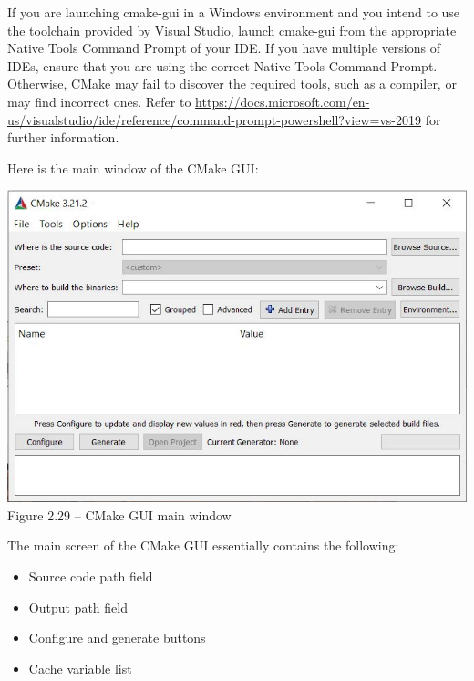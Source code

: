 \begin{tcolorbox}[colback=webgreen!5!white,colframe=webgreen!75!black,title=Note]
If you are launching cmake-gui in a Windows environment and you intend to use the toolchain provided by Visual Studio, launch cmake-gui from the appropriate Native Tools Command Prompt of your IDE. If you have multiple versions of IDEs, ensure that you are using the correct Native Tools Command Prompt. Otherwise, CMake may fail to discover the required tools, such as a compiler, or may find incorrect ones. Refer to \url{https://docs.microsoft.com/en-us/visualstudio/ide/reference/command-prompt-powershell?view=vs-2019} for further information.
\end{tcolorbox}

Here is the main window of the CMake GUI:

\begin{center}
\includegraphics[width=1.\textwidth]{content/1/chapter2/images/29.jpg}\\
Figure 2.29 – CMake GUI main window
\end{center}

The main screen of the CMake GUI essentially contains the following:

\begin{itemize}
\item 
Source code path field

\item 
Output path field

\item 
Configure and generate buttons

\item 
Cache variable list
\end{itemize}

